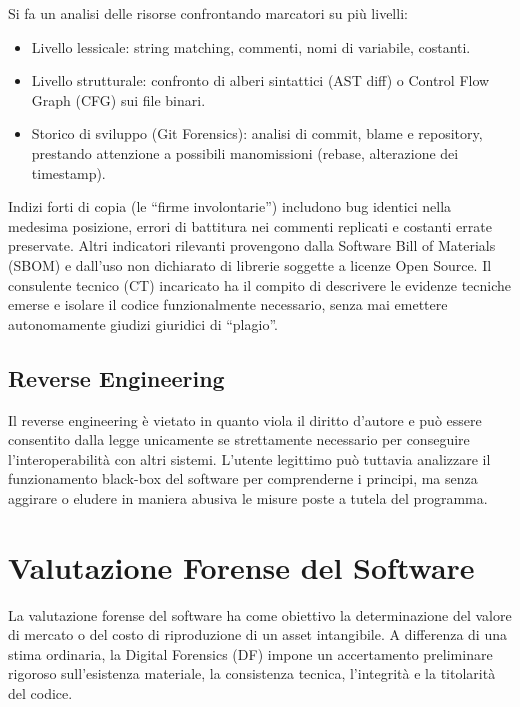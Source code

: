 \documentclass[11pt,a4paper]{article}
\begin{document}
Si fa un analisi delle risorse confrontando marcatori su più livelli:
\begin{itemize}
    \item Livello lessicale: string matching, commenti, nomi di variabile, costanti.
    \item Livello strutturale: confronto di alberi sintattici (AST diff) o Control Flow Graph (CFG) sui file binari.
    \item Storico di sviluppo (Git Forensics): analisi di commit, blame e repository, prestando attenzione a possibili manomissioni (rebase, alterazione dei timestamp).
\end{itemize}

Indizi forti di copia (le ``firme involontarie'') includono bug identici nella medesima posizione, errori di battitura nei commenti replicati e costanti errate preservate. Altri indicatori rilevanti provengono dalla Software Bill of Materials (SBOM) e dall'uso non dichiarato di librerie soggette a licenze Open Source. Il consulente tecnico (CT) incaricato ha il compito di descrivere le evidenze tecniche emerse e isolare il codice funzionalmente necessario, senza mai emettere autonomamente giudizi giuridici di ``plagio''.

\subsection{Reverse Engineering}
Il reverse engineering è vietato in quanto viola il diritto d'autore e può essere consentito dalla legge unicamente se strettamente necessario per conseguire l'interoperabilità con altri sistemi. 
L'utente legittimo può tuttavia analizzare il funzionamento black-box del software per comprenderne i principi, ma senza aggirare o eludere in maniera abusiva le misure poste a tutela del programma.


\section{Valutazione Forense del Software}
La valutazione forense del software ha come obiettivo la determinazione del valore di mercato o del costo di riproduzione di un asset intangibile. A differenza di una stima ordinaria, la Digital Forensics (DF) impone un accertamento preliminare rigoroso sull'esistenza materiale, la consistenza tecnica, l'integrità e la titolarità del codice.
\end{document}
